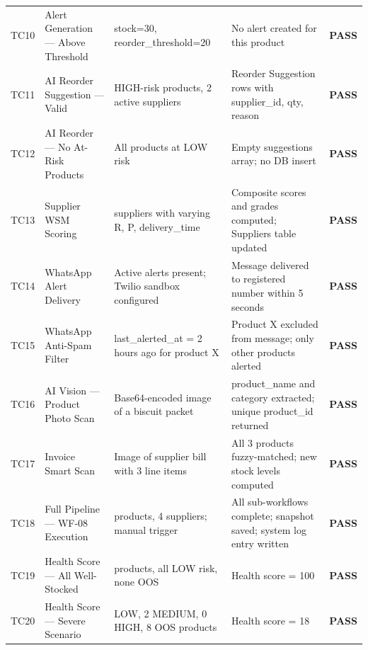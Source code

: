 {\begin{longtable}{@{} p{1.2cm} >{\raggedright\arraybackslash}p{3.5cm} >{\raggedright\arraybackslash}p{4.2cm} >{\raggedright\arraybackslash}p{4.5cm} p{1.5cm} @{}}
TC10 & Alert Generation — Above Threshold &
  stock=30, reorder\_threshold=20 &
  No alert created for this product &
  \textbf{PASS} \\

TC11 & AI Reorder Suggestion — Valid &
  3 HIGH-risk products, 2 active suppliers &
  3 Reorder Suggestion rows with supplier\_id, qty, reason &
  \textbf{PASS} \\

TC12 & AI Reorder — No At-Risk Products &
  All products at LOW risk &
  Empty suggestions array; no DB insert &
  \textbf{PASS} \\

TC13 & Supplier WSM Scoring &
  4 suppliers with varying R, P, delivery\_time &
  Composite scores and grades computed; Suppliers table updated &
  \textbf{PASS} \\

TC14 & WhatsApp Alert Delivery &
  Active alerts present; Twilio sandbox configured &
  Message delivered to registered number within 5 seconds &
  \textbf{PASS} \\

TC15 & WhatsApp Anti-Spam Filter &
  last\_alerted\_at = 2 hours ago for product X &
  Product X excluded from message; only other products alerted &
  \textbf{PASS} \\

TC16 & AI Vision — Product Photo Scan &
  Base64-encoded image of a biscuit packet &
  product\_name and category extracted; unique product\_id returned &
  \textbf{PASS} \\

TC17 & Invoice Smart Scan &
  Image of supplier bill with 3 line items &
  All 3 products fuzzy-matched; new stock levels computed &
  \textbf{PASS} \\

TC18 & Full Pipeline — WF-08 Execution &
  10 products, 4 suppliers; manual trigger &
  All sub-workflows complete; snapshot saved; system log entry written &
  \textbf{PASS} \\

TC19 & Health Score — All Well-Stocked &
  10 products, all LOW risk, none OOS &
  Health score = 100 &
  \textbf{PASS} \\

TC20 & Health Score — Severe Scenario &
  0 LOW, 2 MEDIUM, 0 HIGH, 8 OOS products &
  Health score = 18 &
  \textbf{PASS} \\

\end{longtable}
}

